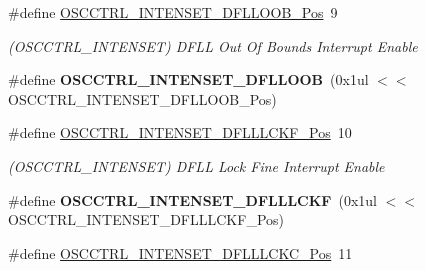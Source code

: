\begin{DoxyCompactItemize}
\item 
\hypertarget{group___s_a_m_l21___o_s_c_c_t_r_l_gab911e0fe7e6ea5dc65c44ae1718d7d32}{}\#define \hyperlink{group___s_a_m_l21___o_s_c_c_t_r_l_gab911e0fe7e6ea5dc65c44ae1718d7d32}{O\+S\+C\+C\+T\+R\+L\+\_\+\+I\+N\+T\+E\+N\+S\+E\+T\+\_\+\+D\+F\+L\+L\+O\+O\+B\+\_\+\+Pos}~9\label{group___s_a_m_l21___o_s_c_c_t_r_l_gab911e0fe7e6ea5dc65c44ae1718d7d32}

\begin{DoxyCompactList}\small\item\em (O\+S\+C\+C\+T\+R\+L\+\_\+\+I\+N\+T\+E\+N\+S\+E\+T) D\+F\+L\+L Out Of Bounds Interrupt Enable \end{DoxyCompactList}\item 
\hypertarget{group___s_a_m_l21___o_s_c_c_t_r_l_ga50faed0c6014445a428a69d34c7a4c5e}{}\#define {\bfseries O\+S\+C\+C\+T\+R\+L\+\_\+\+I\+N\+T\+E\+N\+S\+E\+T\+\_\+\+D\+F\+L\+L\+O\+O\+B}~(0x1ul $<$$<$ O\+S\+C\+C\+T\+R\+L\+\_\+\+I\+N\+T\+E\+N\+S\+E\+T\+\_\+\+D\+F\+L\+L\+O\+O\+B\+\_\+\+Pos)\label{group___s_a_m_l21___o_s_c_c_t_r_l_ga50faed0c6014445a428a69d34c7a4c5e}

\item 
\hypertarget{group___s_a_m_l21___o_s_c_c_t_r_l_gaf38520e46a7d6f00aad451bc70ce0ce9}{}\#define \hyperlink{group___s_a_m_l21___o_s_c_c_t_r_l_gaf38520e46a7d6f00aad451bc70ce0ce9}{O\+S\+C\+C\+T\+R\+L\+\_\+\+I\+N\+T\+E\+N\+S\+E\+T\+\_\+\+D\+F\+L\+L\+L\+C\+K\+F\+\_\+\+Pos}~10\label{group___s_a_m_l21___o_s_c_c_t_r_l_gaf38520e46a7d6f00aad451bc70ce0ce9}

\begin{DoxyCompactList}\small\item\em (O\+S\+C\+C\+T\+R\+L\+\_\+\+I\+N\+T\+E\+N\+S\+E\+T) D\+F\+L\+L Lock Fine Interrupt Enable \end{DoxyCompactList}\item 
\hypertarget{group___s_a_m_l21___o_s_c_c_t_r_l_gac3de39bf56d3199b2b5278340c7326a6}{}\#define {\bfseries O\+S\+C\+C\+T\+R\+L\+\_\+\+I\+N\+T\+E\+N\+S\+E\+T\+\_\+\+D\+F\+L\+L\+L\+C\+K\+F}~(0x1ul $<$$<$ O\+S\+C\+C\+T\+R\+L\+\_\+\+I\+N\+T\+E\+N\+S\+E\+T\+\_\+\+D\+F\+L\+L\+L\+C\+K\+F\+\_\+\+Pos)\label{group___s_a_m_l21___o_s_c_c_t_r_l_gac3de39bf56d3199b2b5278340c7326a6}

\item 
\hypertarget{group___s_a_m_l21___o_s_c_c_t_r_l_ga6ad90e329e97b3b3e480ef583fdf3eb6}{}\#define \hyperlink{group___s_a_m_l21___o_s_c_c_t_r_l_ga6ad90e329e97b3b3e480ef583fdf3eb6}{O\+S\+C\+C\+T\+R\+L\+\_\+\+I\+N\+T\+E\+N\+S\+E\+T\+\_\+\+D\+F\+L\+L\+L\+C\+K\+C\+\_\+\+Pos}~11\label{group___s_a_m_l21___o_s_c_c_t_r_l_ga6ad90e329e97b3b3e480ef583fdf3eb6}


\end{DoxyCompactItemize}
